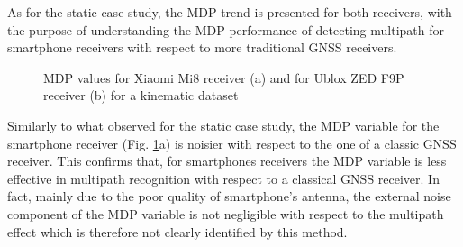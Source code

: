 As for the static case study, the MDP trend is presented for both receivers, with the purpose of understanding the MDP performance of detecting multipath for smartphone receivers with respect to more traditional GNSS receivers.

\begin{figure}[H] 
	\centering
    \caption{MDP values for Xiaomi Mi8 receiver (a) and for Ublox ZED F9P receiver (b) for a kinematic dataset}
	\label{FIG:test3mdp_mdpxiaomistonex} 
\end{figure}

Similarly to what observed for the static case study, the MDP variable for the smartphone receiver (Fig. \ref{FIG:test3mdp_mdpxiaomistonex}a) is noisier with respect to the one of a classic GNSS receiver. This confirms that, for smartphones receivers the MDP variable is less effective in multipath recognition with respect to a classical GNSS receiver. In fact, mainly due 
 to the poor quality of smartphone's antenna, the external noise component of the MDP variable is not negligible with respect to the multipath effect which is therefore not clearly identified by this method.
 
